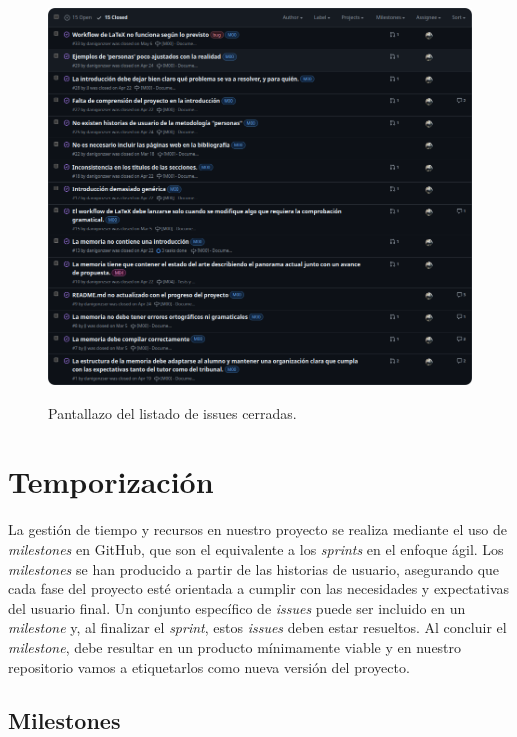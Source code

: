 \begin{figure}[H]
    \caption{Pantallazo del listado de issues cerradas.}
    \centering
    \vspace*{0.5cm}
    \includegraphics[scale=0.2]{figuras/listado_issues_cerradas.png}\label{fig:figuras/listado_issues_cerradas.png}
\end{figure}

\section{Temporización}

La gestión de tiempo y recursos en nuestro proyecto se realiza mediante el uso de \textit{milestones} en GitHub, que son el equivalente a los \textit{sprints} en el enfoque ágil. Los \textit{milestones} se han producido a partir de las historias de usuario, asegurando que cada fase del proyecto esté orientada a cumplir con las necesidades y expectativas del usuario final. Un conjunto específico de \textit{issues} puede ser incluido en un \textit{milestone} y, al finalizar el \textit{sprint}, estos \textit{issues} deben estar resueltos. Al concluir el \textit{milestone}, debe resultar en un producto mínimamente viable y en nuestro repositorio vamos a etiquetarlos como nueva versión del proyecto.

\subsection{Milestones}

